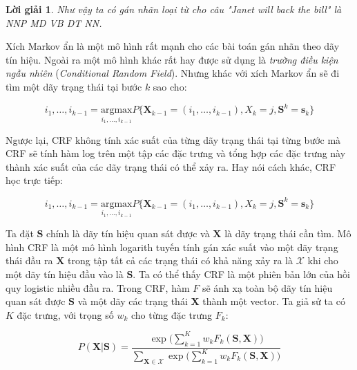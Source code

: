 \documentclass[14pt, a4paper]{article}
\numberwithin{equation}{section}
\numberwithin{figure}{section}
\theoremstyle{sltheorem}
\theoremstyle{soltheorem}
\newtheorem*{loigiai}{Lời giải}
\numberwithin{dl}{section}
\numberwithin{md}{section}
\numberwithin{vd}{section}
\begin{document}
\begin{loigiai}
        Như vậy ta có gán nhãn loại từ cho câu "Janet will back the bill" là NNP MD VB DT NN.

    \end{loigiai}

    Xích Markov ẩn là một mô hình rất mạnh cho các bài toán gán nhãn theo dãy tín hiệu.
    Ngoài ra một mô hình khác rất hay được sử dụng là \textit{trường điều kiện ngẫu nhiên} (\textit{Conditional Random Field}).
    Nhưng khác với xích Markov ẩn sẽ đi tìm một dãy trạng thái tại bước $k$ sao cho:

    \begin{equation*}
        i_1, \dots, i_{k-1} = \underset{i_1, \dots, i_{k-1}}{\mathrm{argmax}} P \lbrace \mathbf{X}_{k-1} = (i_1, \dots, i_{k-1}), X_k = j, \mathbf{S}^k = \mathbf{s}_k \rbrace
    \end{equation*}

    Ngược lại, CRF không tính xác suất của từng dãy trạng thái tại từng bước mà CRF sẽ tính hàm log trên một tập các đặc trưng và tổng hợp các đặc trưng này thành xác suất của các dãy trạng thái có thể xảy ra.
    Hay nói cách khác, CRF học trực tiếp:

    \begin{equation*}
        i_1, \dots, i_{k-1} = \underset{i_1, \dots, i_{k-1}}{\mathrm{argmax}} P \lbrace \mathbf{X}_{k-1} = (i_1, \dots, i_{k-1}), X_k = j, \mathbf{S}^k = \mathbf{s}_k \rbrace
    \end{equation*}

    Ta đặt $\mathbf{S}$ chính là dãy tín hiệu quan sát được và $\mathbf{X}$ là dãy trạng thái cần tìm.
    Mô hình CRF là một mô hình logarith tuyến tính gán xác suất vào một dãy trạng thái đầu ra $\mathbf{X}$ trong tập tất cả các trạng thái có khả năng xảy ra là $\mathscr{X}$ khi cho một dãy tín hiệu đầu vào là $\mathbf{S}$.
    Ta có thể thấy CRF là một phiên bản lớn của hồi quy logistic nhiều đầu ra.
    Trong CRF, hàm $F$ sẽ ánh xạ toàn bộ dãy tín hiệu quan sát được $\mathbf{S}$ và một dãy các trạng thái $\mathbf{X}$ thành một vector.
    Ta giả sử ta có $K$ đặc trưng, với trọng số $w_k$ cho từng đặc trưng $F_k$:

    \begin{equation*}
        P(\mathbf{X} \vert \mathbf{S}) = \dfrac{\exp\Bigg (\displaystyle\sum_{k=1}^K w_k F_k (\mathbf{S}, \mathbf{X}) \Bigg)}{\displaystyle\sum_{\mathbf{X} \in \mathscr{X}}\exp\Bigg (\sum_{k=1}^K w_k F_k (\mathbf{S}, \mathbf{X}) \Bigg)}
    \end{equation*}
\end{document}
